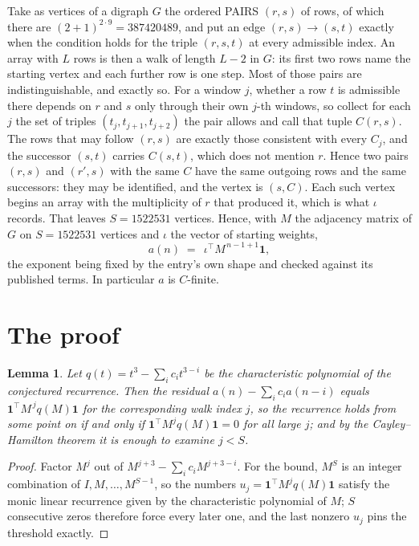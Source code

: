 \documentclass[11pt,a4paper]{article}
\theoremstyle{plain}
\newtheorem{lemma}[theorem]{Lemma}
\theoremstyle{definition}
\begin{document}
Take as vertices of a digraph $G$ the ordered PAIRS $(r,s)$ of rows, of which there are
$(2+1)^{2\cdot9}=387420489$, and put an edge $(r,s)\to(s,t)$ exactly when the condition
holds for the triple $(r,s,t)$ at every admissible index. An array with $L$ rows is then a
walk of length $L-2$ in $G$: its first two rows name the starting vertex and each further
row is one step. Most of those pairs are indistinguishable, and exactly so. For a window $j$, whether a row $t$ is admissible there depends on $r$ and $s$ only through their own $j$-th windows, so collect for each $j$ the set of triples $(t_j,t_{j+1},t_{j+2})$ the pair allows and call that tuple $C(r,s)$. The rows that may follow $(r,s)$ are exactly those consistent with every $C_j$, and the successor $(s,t)$ carries $C(s,t)$, which does not mention $r$. Hence two pairs $(r,s)$ and $(r',s)$ with the same $C$ have the same outgoing rows and the same successors: they may be identified, and the vertex is $(s,C)$. Each such vertex begins an array with the multiplicity of $r$ that produced it, which is what $\iota$ records. That leaves $S=1522531$ vertices. Hence, with $M$ the adjacency matrix of $G$ on $S=1522531$ vertices and
$\iota$ the vector of starting weights,
\[
a(n)\;=\;\,\iota^{\!\top}M^{\,n-1+1}\mathbf{1},
\]
the exponent being fixed by the entry's own shape and checked against its published terms.
In particular $a$ is $C$-finite.

\section{The proof}

\begin{lemma}\label{lem:crit}
Let $q(t)=t^{3}-\sum_i c_it^{3-i}$ be the characteristic polynomial of the
conjectured recurrence. Then the residual $a(n)-\sum_ic_ia(n-i)$ equals
$\mathbf{1}^{\!\top}M^{\,j}q(M)\mathbf{1}$ for the corresponding walk index
$j$, so the recurrence holds from some point on if and only if
$\mathbf{1}^{\!\top}M^{j}q(M)\mathbf{1}=0$ for all large $j$; and by the
Cayley--Hamilton theorem it is enough to examine $j<S$.
\end{lemma}

\begin{proof}
Factor $M^{j}$ out of $M^{j+3}-\sum_ic_iM^{j+3-i}$. For the bound, $M^{S}$
is an integer combination of $I,M,\dots,M^{S-1}$, so the numbers
$u_j=\mathbf{1}^{\!\top}M^{j}q(M)\mathbf{1}$ satisfy the monic linear recurrence given by
the characteristic polynomial of $M$; $S$ consecutive zeros therefore force every later one,
and the last nonzero $u_j$ pins the threshold exactly.
\end{proof}
\end{document}
